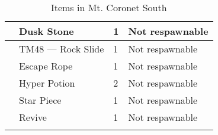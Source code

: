 \begin{longtable}{|| l l l l ||}%
\hline%
&Dusk Stone&1&Not respawnable\\%
\hline%
&TM48 — Rock Slide&1&Not respawnable\\%
\hline%
&Escape Rope&1&Not respawnable\\%
\hline%
&Hyper Potion&2&Not respawnable\\%
\hline%
&Star Piece&1&Not respawnable\\%
\hline%
&Revive&1&Not respawnable\\%
\hline%
\endhead%
\hline%
\caption{Items in Mt. Coronet South}%
\label{tab:Mt.CoronetSouthItems}%
\end{longtable}